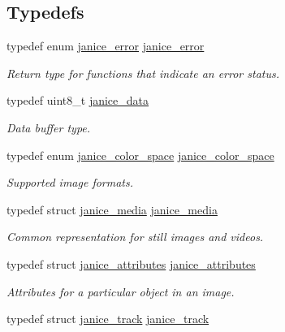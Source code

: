 \subsection*{Typedefs}
\begin{DoxyCompactItemize}
\item 
typedef enum \hyperlink{group__janice_ga4873d49c1f9d6a6880dfbd485cf6ba72}{janice\+\_\+error} \hyperlink{group__janice_gac9071fe2c752efef60aa3f932a290fda}{janice\+\_\+error}
\begin{DoxyCompactList}\small\item\em Return type for functions that indicate an error status. \end{DoxyCompactList}\item 
\hypertarget{group__janice_ga63103e7e1c9df7d7403640223f3f6f07}{}typedef uint8\+\_\+t \hyperlink{group__janice_ga63103e7e1c9df7d7403640223f3f6f07}{janice\+\_\+data}\label{group__janice_ga63103e7e1c9df7d7403640223f3f6f07}

\begin{DoxyCompactList}\small\item\em Data buffer type. \end{DoxyCompactList}\item 
\hypertarget{group__janice_ga2bbe1c8abfa34a1fdc1cc88b6c833715}{}typedef enum \hyperlink{group__janice_ga4040c8aa81857fc2102f27cf34cd973e}{janice\+\_\+color\+\_\+space} \hyperlink{group__janice_ga2bbe1c8abfa34a1fdc1cc88b6c833715}{janice\+\_\+color\+\_\+space}\label{group__janice_ga2bbe1c8abfa34a1fdc1cc88b6c833715}

\begin{DoxyCompactList}\small\item\em Supported image formats. \end{DoxyCompactList}\item 
typedef struct \hyperlink{structjanice__media}{janice\+\_\+media} \hyperlink{group__janice_gabbe38be774628d27c4ab0695bd8cf155}{janice\+\_\+media}
\begin{DoxyCompactList}\small\item\em Common representation for still images and videos. \end{DoxyCompactList}\item 
typedef struct \hyperlink{structjanice__attributes}{janice\+\_\+attributes} \hyperlink{group__janice_gaf16b5ce9751b8450f61adb9a957b0fc2}{janice\+\_\+attributes}
\begin{DoxyCompactList}\small\item\em Attributes for a particular object in an image. \end{DoxyCompactList}\item 
\hypertarget{group__janice_ga142bf5c16f0474bb821c3a0d4adf4009}{}typedef struct \hyperlink{structjanice__track}{janice\+\_\+track} \hyperlink{group__janice_ga142bf5c16f0474bb821c3a0d4adf4009}{janice\+\_\+track}\label{group__janice_ga142bf5c16f0474bb821c3a0d4adf4009}


\end{DoxyCompactItemize}
